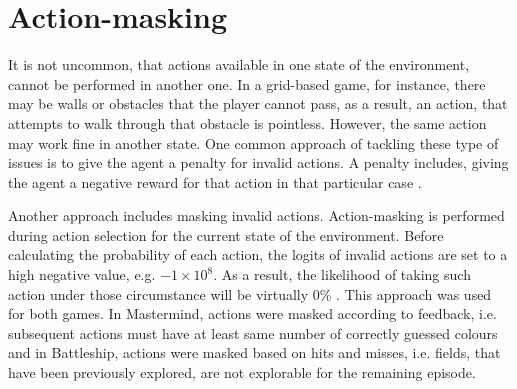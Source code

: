 \section{Action-masking}
\label{sec:action_masking}
It is not uncommon, that actions available in one state of the environment, cannot be performed in another one. In a grid-based game, for instance, there may be walls or obstacles that the player cannot pass, as a result, an action, that attempts to walk through that obstacle is pointless. However, the same action may work fine in another state. One common approach of tackling these type of issues is to give the agent a penalty for invalid actions. A penalty includes, giving the agent a negative reward for that action in that particular case \cite{huang2020closer}.

Another approach includes masking invalid actions. Action-masking is performed during action selection for the current state of the environment. Before calculating the probability of each action, the logits of invalid actions are set to a high negative value, e.g. $-1 \times 10^8$. As a result, the likelihood of taking such action under those circumstance will be virtually 0\% \cite{huang2020closer}. This approach was used for both games. In Mastermind, actions were masked according to feedback, i.e. subsequent actions must have at least same number of correctly guessed colours and in Battleship, actions were masked based on hits and misses, i.e. fields, that have been previously explored, are not explorable for the remaining episode. 